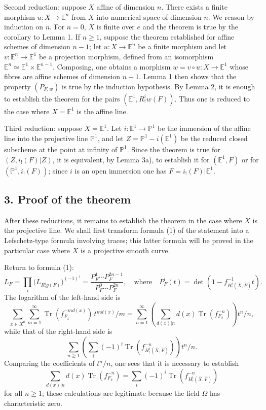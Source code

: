 \documentclass[11pt]{article}
\providecommand{\Tr}{\operatorname{Tr}}
\providecommand{\Tr}{\operatorname{Tr}}
\providecommand{\Tr}{\operatorname{Tr}}
\providecommand{\Tr}{\operatorname{Tr}}
\providecommand{\Tr}{\operatorname{Tr}}
\begin{document}
Second reduction: suppose $X$ affine of dimension $n$. There exists a finite morphism $u:X\to\mathbb E^n$ from $X$ into numerical space of dimension $n$. We reason by induction on $n$. For $n=0$, $X$ is finite over $e$ and the theorem is true by the corollary to Lemma 1. If $n\ge1$, suppose the theorem established for affine schemes of dimension $n-1$; let $u:X\to\mathbb E^n$ be a finite morphism and let $v:\mathbb E^n\to\mathbb E^1$ be a projection morphism, defined from an isomorphism $\mathbb E^n\simeq\mathbb E^1\times\mathbb E^{n-1}$. Composing, one obtains a morphism $w=v\circ u:X\to\mathbb E^1$ whose fibres are affine schemes of dimension $n-1$. Lemma 1 then shows that the property $(P_{F,w})$ is true by the induction hypothesis. By Lemma 2, it is enough to establish the theorem for the pairs $(\mathbb E^1,R^i_!w(F))$. Thus one is reduced to the case where $X=\mathbb E^1$ is the affine line.

Third reduction: suppose $X=\mathbb E^1$. Let $i:\mathbb E^1\to\mathbb P^1$ be the immersion of the affine line into the projective line $\mathbb P^1$, and let $Z=\mathbb P^1-i(\mathbb E^1)$ be the reduced closed subscheme at the point at infinity of $\mathbb P^1$. Since the theorem is true for $(Z,i_!(F)|Z)$, it is equivalent, by Lemma 3a), to establish it for $(\mathbb E^1,F)$ or for $(\mathbb P^1,i_!(F))$; since $i$ is an open immersion one has $F=i_!(F)|\mathbb E^1$.

\subsection*{3. Proof of the theorem}

After these reductions, it remains to establish the theorem in the case where $X$ is the projective line. We shall first transform formula (1) of the statement into a Lefschetz-type formula involving traces; this latter formula will be proved in the particular case where $X$ is a projective smooth curve.

Return to formula (1):
\[
L_F=\prod_i\bigl(L_{R^i_!g(F)}\bigr)^{(-1)^i}
=\frac{P_F^1\cdots P_F^{2n-1}}{P_F^0\cdots P_F^{2n}},
\quad\text{where}\quad
P_F^i(t)=\det(1-f^{-1}_{H^i_!(\bar X,\bar F)}t).
\]
The logarithm of the left-hand side is
\[
\sum_{x\in X^0}\sum_{m=1}^{\infty}\Tr(f_{F_{\bar x}}^{-m d(x)})\,t^{m d(x)}/m
=\sum_{n=1}^{\infty}\left(\sum_{d(x)|n} d(x)\Tr(f_{F_{\bar x}}^{-n})\right)t^n/n,
\]
while that of the right-hand side is
\[
\sum_{n\ge1}\left(\sum_i(-1)^i\Tr(f^{-n}_{H^i_!(\bar X,\bar F)})\right)t^n/n.
\]
Comparing the coefficients of $t^n/n$, one sees that it is necessary to establish
\[
\sum_{d(x)|n}d(x)\Tr(f_{F_{\bar x}}^{-n})
=\sum_i(-1)^i\Tr(f^{-n}_{H^i_!(\bar X,\bar F)})
\tag{2}
\]
for all $n\ge1$; these calculations are legitimate because the field $\Omega$ has characteristic zero.
\end{document}
